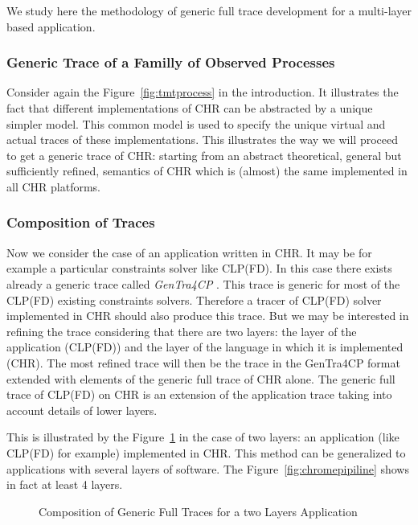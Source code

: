 We study here the methodology of generic full trace development for a multi-layer based application.

\subsubsection{Generic Trace of a Familly of Observed Processes}

Consider again the Figure~\ref{fig:tmtprocess} in the introduction.
It illustrates the fact that different implementations of CHR can be abstracted by a unique simpler model.
This common model is used to specify the unique virtual and actual traces of these implementations.
This illustrates the way we will proceed to get a generic trace of CHR: starting from an abstract theoretical, general but sufficiently refined, semantics of CHR which is (almost) the same implemented in all CHR platforms.


\subsubsection{Composition of Traces}
\label{sec:compos}

Now we consider the case of an application written in CHR. It may be for example a particular constraints solver like CLP(FD). In this case there exists already a generic trace called {\em GenTra4CP} \cite{oadimpac}. This trace is generic for most of the CLP(FD) existing constraints solvers. Therefore a tracer of CLP(FD) solver implemented in CHR should also produce this trace. But we may be interested in refining the trace considering that there are two layers: the layer of the application (CLP(FD)) and the layer of the language in which it is implemented (CHR). The most refined trace will then be the trace in the GenTra4CP format extended with elements of the generic full trace of CHR alone. The generic full trace of CLP(FD) on CHR is an extension of the application trace taking into account details of lower layers. 

This is illustrated by the Figure~\ref{fig:componentsaplchr} in the case of two layers: an application (like CLP(FD) for example) implemented in CHR. This method can be generalized to applications with several layers of software. The Figure~\ref{fig:chromepipiline} shows in fact at least 4 layers.

\begin{figure} \centering
{}
\caption[Combination of Generic Full Traces for a two Layers Application]
{Composition of Generic Full Traces for a two Layers Application}
\label{fig:componentsaplchr}
\end{figure} 

